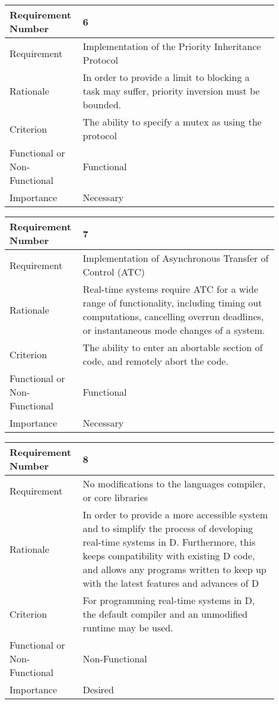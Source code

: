 \begin{table}[!htbp]
\centering
\begin{tabular}{|L{0.2\linewidth}|L{0.7\linewidth}|}
\hline
Requirement Number & 6 \\ \hline
Requirement & Implementation of the Priority Inheritance Protocol \\ \hline
Rationale      & In order to provide a limit to blocking a task may suffer, priority 
                inversion must be bounded. \\ \hline
Criterion      & The ability to specify a mutex as using the protocol\\ \hline
Functional or Non-Functional & Functional \\ \hline
Importance     & Necessary \\ \hline
\end{tabular}
\end{table}
\begin{table}[!htbp]
\centering
\begin{tabular}{|L{0.2\linewidth}|L{0.7\linewidth}|}
\hline
Requirement Number & 7 \\ \hline
Requirement & Implementation of Asynchronous Transfer of Control (ATC) \\ \hline
Rationale      & Real-time systems require ATC for a wide range of functionality, 
                including timing out computations, cancelling overrun deadlines,  
                or instantaneous mode changes of a system. \\ \hline
Criterion      & The ability to enter an abortable section of code, and remotely  
                abort the code. \\ \hline
Functional or Non-Functional & Functional \\ \hline
Importance     & Necessary \\ \hline
\end{tabular}
\end{table}
\begin{table}[!htbp]
\centering
\begin{tabular}{|L{0.2\linewidth}|L{0.7\linewidth}|}
\hline
Requirement Number & 8 \\ \hline
Requirement & No modifications to the languages compiler, or core libraries \\ \hline
Rationale      & In order to provide a more accessible system and to simplify the 
                process of developing real-time systems in D. Furthermore, this 
                keeps compatibility with existing D code, and allows any programs  
                written to keep up with the latest features and advances of D \\ \hline
Criterion      & For programming real-time systems in D, the default compiler and  
                an unmodified runtime may be used. \\ \hline
Functional or Non-Functional & Non-Functional \\ \hline
Importance     & Desired \\ \hline
\end{tabular}
\end{table}
